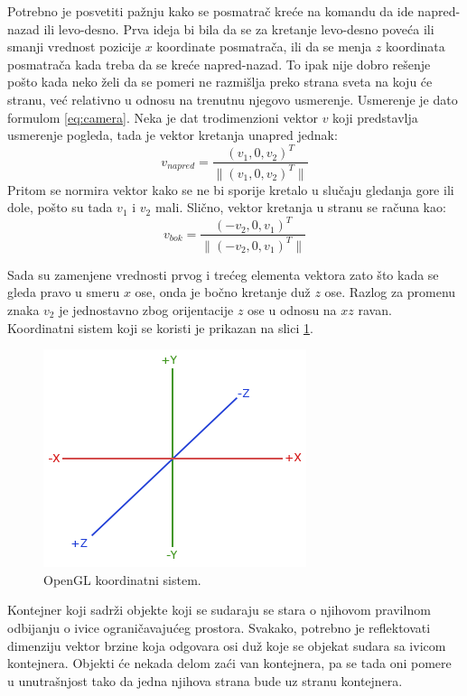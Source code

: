 \documentclass[12pt,oneside]{memoir}
\begin{document}
Potrebno je posvetiti pažnju kako se posmatrač kreće na komandu da ide napred-nazad ili levo-desno.
Prva ideja bi bila da se za kretanje levo-desno poveća ili smanji vrednost pozicije $x$ koordinate posmatrača,
ili da se menja $z$ koordinata posmatrača kada treba da se kreće napred-nazad.
To ipak nije dobro rešenje pošto kada neko želi da se pomeri ne razmišlja preko strana sveta na koju će stranu, 
već relativno u odnosu na trenutnu njegovo usmerenje. Usmerenje je dato formulom \ref{eq:camera}.
Neka je dat trodimenzioni vektor $v$ koji predstavlja usmerenje pogleda, tada je vektor 
kretanja unapred jednak: 
$$ v_{napred} = \frac{(v_1, 0, v_2)^T}{\|(v_1, 0, v_2)^T\|} $$
Pritom se normira vektor kako se ne bi sporije kretalo u slučaju gledanja gore ili dole, 
pošto su tada $v_1$ i $v_2$ mali.
Slično, vektor kretanja u stranu se računa kao:
$$ v_{bok} = \frac{(-v_2, 0, v_1)^T}{\|(-v_2, 0, v_1)^T\|} $$

Sada su zamenjene vrednosti prvog i trećeg elementa vektora zato što kada se gleda pravo u smeru $x$ ose, 
onda je bočno kretanje duž $z$ ose. Razlog za promenu znaka $v_2$ je jednostavno zbog orijentacije $z$ ose u odnosu na $xz$ ravan.
Koordinatni sistem koji se koristi je prikazan na slici \ref{fig:coord}.

\begin{figure}[h!]
	\centerfloat
	\includegraphics[scale=1]{coord.png}
	\caption{OpenGL koordinatni sistem.}
	\label{fig:coord}
\end{figure}

Kontejner koji sadrži objekte koji se sudaraju se stara o njihovom pravilnom odbijanju o ivice ograničavajućeg prostora.
Svakako, potrebno je reflektovati dimenziju vektor brzine koja odgovara osi duž koje se objekat sudara sa ivicom kontejnera.
Objekti će nekada delom zaći van kontejnera, pa se tada oni pomere u unutrašnjost tako da jedna njihova strana bude uz stranu kontejnera.
\end{document}
